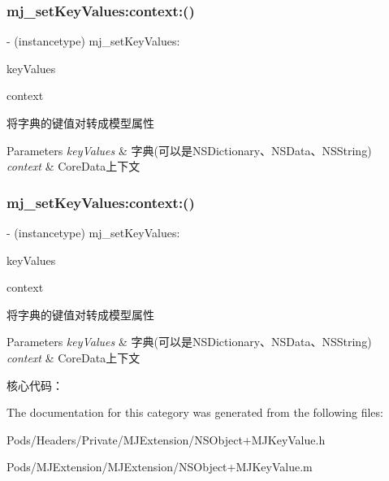 \subsubsection{\texorpdfstring{mj\+\_\+set\+Key\+Values\+:context\+:()}{mj\_setKeyValues:context:()}\hspace{0.1cm}{\footnotesize\ttfamily [2/3]}}
{\footnotesize\ttfamily -\/ (instancetype) mj\+\_\+set\+Key\+Values\+: \begin{DoxyParamCaption}\item[{(id)}]{key\+Values }\item[{context:(N\+S\+Managed\+Object\+Context $\ast$)}]{context }\end{DoxyParamCaption}}

将字典的键值对转成模型属性 
\begin{DoxyParams}{Parameters}
{\em key\+Values} & 字典(可以是\+N\+S\+Dictionary、\+N\+S\+Data、\+N\+S\+String) \\
\hline
{\em context} & Core\+Data上下文 \\
\hline
\end{DoxyParams}
\mbox{\label{category_n_s_object_07_m_j_key_value_08_a78ba4bcf5f9bda89ddb88fcb31fb4053}} 
\subsubsection{\texorpdfstring{mj\+\_\+set\+Key\+Values\+:context\+:()}{mj\_setKeyValues:context:()}\hspace{0.1cm}{\footnotesize\ttfamily [3/3]}}
{\footnotesize\ttfamily -\/ (instancetype) mj\+\_\+set\+Key\+Values\+: \begin{DoxyParamCaption}\item[{(id)}]{key\+Values }\item[{context:(N\+S\+Managed\+Object\+Context $\ast$)}]{context }\end{DoxyParamCaption}}

将字典的键值对转成模型属性 
\begin{DoxyParams}{Parameters}
{\em key\+Values} & 字典(可以是\+N\+S\+Dictionary、\+N\+S\+Data、\+N\+S\+String) \\
\hline
{\em context} & Core\+Data上下文\\
\hline
\end{DoxyParams}
核心代码： 

The documentation for this category was generated from the following files\+:\begin{DoxyCompactItemize}
\item 
Pods/\+Headers/\+Private/\+M\+J\+Extension/N\+S\+Object+\+M\+J\+Key\+Value.\+h\item 
Pods/\+M\+J\+Extension/\+M\+J\+Extension/N\+S\+Object+\+M\+J\+Key\+Value.\+m\end{DoxyCompactItemize}
